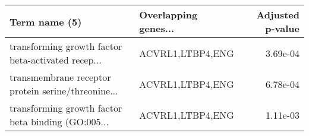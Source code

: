 \begin{tabular}{llr}
\toprule
                                     Term name (5) & Overlapping genes... &  Adjusted p-value \\
\midrule
transforming growth factor beta-activated recep... &     ACVRL1,LTBP4,ENG &          3.69e-04 \\
transmembrane receptor protein serine/threonine... &     ACVRL1,LTBP4,ENG &          6.78e-04 \\
transforming growth factor beta binding (GO:005... &     ACVRL1,LTBP4,ENG &          1.11e-03 \\
\bottomrule
\end{tabular}
